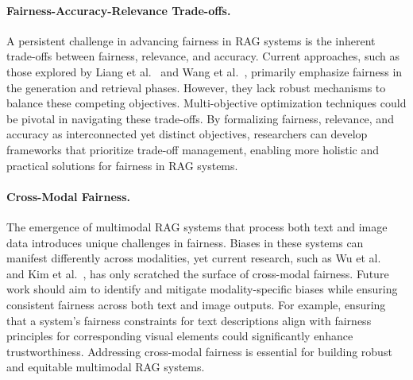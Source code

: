 \paragraph{Fairness-Accuracy-Relevance Trade-offs.} A persistent challenge in advancing fairness in RAG systems is the inherent trade-offs between fairness, relevance, and accuracy. Current approaches, such as those explored by Liang et al.~\cite{liang2022holistic} and Wang et al.~\cite{wang2023decodingtrust}, primarily emphasize fairness in the generation and retrieval phases. However, they lack robust mechanisms to balance these competing objectives. Multi-objective optimization techniques could be pivotal in navigating these trade-offs. By formalizing fairness, relevance, and accuracy as interconnected yet distinct objectives, researchers can develop frameworks that prioritize trade-off management, enabling more holistic and practical solutions for fairness in RAG systems.

\paragraph{Cross-Modal Fairness.} The emergence of multimodal RAG systems that process both text and image data introduces unique challenges in fairness. Biases in these systems can manifest differently across modalities, yet current research, such as Wu et al.~\cite{wu2024does} and Kim et al.~\cite{kim2024towards}, has only scratched the surface of cross-modal fairness. Future work should aim to identify and mitigate modality-specific biases while ensuring consistent fairness across both text and image outputs. For example, ensuring that a system’s fairness constraints for text descriptions align with fairness principles for corresponding visual elements could significantly enhance trustworthiness. Addressing cross-modal fairness is essential for building robust and equitable multimodal RAG systems.